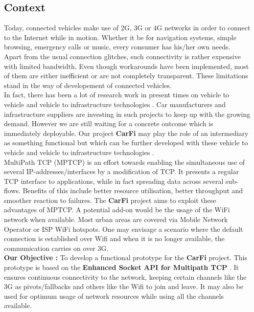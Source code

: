\documentclass[a4paper,11pt]{article}
\begin{document}
		\subsection{Context}
			\begin{description}
				\item \hspace{2cm} Today, connected vehicles make use of 2G, 3G or 4G networks in order to connect to the Internet while in motion. Whether it be for navigation systems, simple browsing, emergency calls or music, every consumer has his/her own needs. \\

				Apart from the usual connection glitches, such connectivity is rather expensive with limited bandwidth. Even though workarounds have been implemented, most of them are either inefficient or are not completely transparent. These limitations stand in the way of developement of connected vehicles. \\

				In fact, there has been a lot of research work in present times on vehicle to vehicle and vehicle to infrastructure technologies \cite[V2x]{V2I}. Car manufacturers and infrastructure suppliers are investing in such projects to keep up with the growing demand. However we are still waiting for a concrete outcome which is immediately deployable. Our project \textbf{CarFi} may play the role of an intermediary as something functional but which can be further developed with these vehicle to vehicle and vehicle to infrastructure technologies \cite[V2x]{V2x, smartcities}. \\

				MultiPath TCP (MPTCP) is an effort towards enabling the simultaneous use of several IP-addresses/interfaces by a modification of TCP. It presents a regular TCP interface to applications, while in fact spreading data across several sub-flows. Benefits of this include better resource utilisation, better throughput and smoother reaction to failures. The \textbf{CarFi} project aims to exploit these advantages of MPTCP. A potential add-on would be the usage of the WiFi network when available. Most urban areas are covered via Mobile Network Operator or ISP WiFi hotspots. One may envisage a scenario where the default connection is established over Wifi and when it is no longer available, the communication carries on over 3G. \\

				\textbf{Our Objective :} To develop a functional prototype for the \textbf{CarFi} project. This prototype is based on the \textbf{Enhanced Socket API for Multipath TCP} \cite[API]{api}. It ensures continuous connectivity to the network, keeping certain channels like the 3G as pivots/fallbacks and others like the Wifi to join and leave. It may also be used for optimum usage of network resources while using all the channels available.
				
			\end{description}
	
\end{document}
